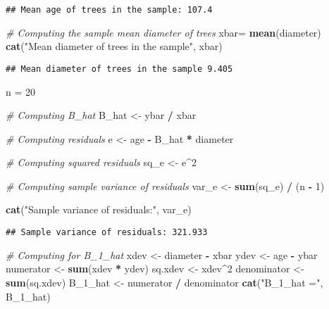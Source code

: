 \documentclass[
]{article}
\newenvironment{Shaded}{\begin{snugshade}}{\end{snugshade}}
\newcommand{\CommentTok}[1]{\textcolor[rgb]{0.56,0.35,0.01}{\textit{#1}}}
\newcommand{\DecValTok}[1]{\textcolor[rgb]{0.00,0.00,0.81}{#1}}
\newcommand{\FunctionTok}[1]{\textcolor[rgb]{0.13,0.29,0.53}{\textbf{#1}}}
\newcommand{\NormalTok}[1]{#1}
\newcommand{\OtherTok}[1]{\textcolor[rgb]{0.56,0.35,0.01}{#1}}
\newcommand{\SpecialCharTok}[1]{\textcolor[rgb]{0.81,0.36,0.00}{\textbf{#1}}}
\newcommand{\StringTok}[1]{\textcolor[rgb]{0.31,0.60,0.02}{#1}}
\begin{document}
\begin{verbatim}
## Mean age of trees in the sample: 107.4
\end{verbatim}

\begin{Shaded}
\begin{Highlighting}[]
\CommentTok{\# Computing the sample mean diameter of trees}
\NormalTok{xbar}\OtherTok{=} \FunctionTok{mean}\NormalTok{(diameter)}
\FunctionTok{cat}\NormalTok{(}\StringTok{"Mean diameter of trees in the sample"}\NormalTok{, xbar)}
\end{Highlighting}
\end{Shaded}

\begin{verbatim}
## Mean diameter of trees in the sample 9.405
\end{verbatim}

\begin{Shaded}
\begin{Highlighting}[]
\NormalTok{n }\OtherTok{=} \DecValTok{20}

\CommentTok{\# Computing B\_hat}
\NormalTok{B\_hat }\OtherTok{\textless{}{-}}\NormalTok{ ybar }\SpecialCharTok{/}\NormalTok{ xbar}

\CommentTok{\# Computing residuals }
\NormalTok{e }\OtherTok{\textless{}{-}}\NormalTok{ age }\SpecialCharTok{{-}}\NormalTok{ B\_hat }\SpecialCharTok{*}\NormalTok{ diameter}

\CommentTok{\# Computing squared residuals}
\NormalTok{sq\_e }\OtherTok{\textless{}{-}}\NormalTok{ e}\SpecialCharTok{\^{}}\DecValTok{2}

\CommentTok{\# Computing sample variance of residuals}
\NormalTok{var\_e }\OtherTok{\textless{}{-}} \FunctionTok{sum}\NormalTok{(sq\_e) }\SpecialCharTok{/}\NormalTok{ (n }\SpecialCharTok{{-}} \DecValTok{1}\NormalTok{)}

\FunctionTok{cat}\NormalTok{(}\StringTok{"Sample variance of residuals:"}\NormalTok{, var\_e)}
\end{Highlighting}
\end{Shaded}

\begin{verbatim}
## Sample variance of residuals: 321.933
\end{verbatim}

\begin{Shaded}
\begin{Highlighting}[]
\CommentTok{\# Computing for B\_1\_hat}
\NormalTok{xdev }\OtherTok{\textless{}{-}}\NormalTok{ diameter }\SpecialCharTok{{-}}\NormalTok{ xbar}
\NormalTok{ydev }\OtherTok{\textless{}{-}}\NormalTok{ age }\SpecialCharTok{{-}}\NormalTok{ ybar}
\NormalTok{numerator }\OtherTok{\textless{}{-}} \FunctionTok{sum}\NormalTok{(xdev }\SpecialCharTok{*}\NormalTok{ ydev)}
\NormalTok{sq.xdev }\OtherTok{\textless{}{-}}\NormalTok{ xdev}\SpecialCharTok{\^{}}\DecValTok{2}
\NormalTok{denominator }\OtherTok{\textless{}{-}} \FunctionTok{sum}\NormalTok{(sq.xdev)}
\NormalTok{B\_1\_hat }\OtherTok{\textless{}{-}}\NormalTok{ numerator }\SpecialCharTok{/}\NormalTok{ denominator}
\FunctionTok{cat}\NormalTok{(}\StringTok{"B\_1\_hat ="}\NormalTok{, B\_1\_hat)}
\end{Highlighting}
\end{Shaded}
\end{document}
